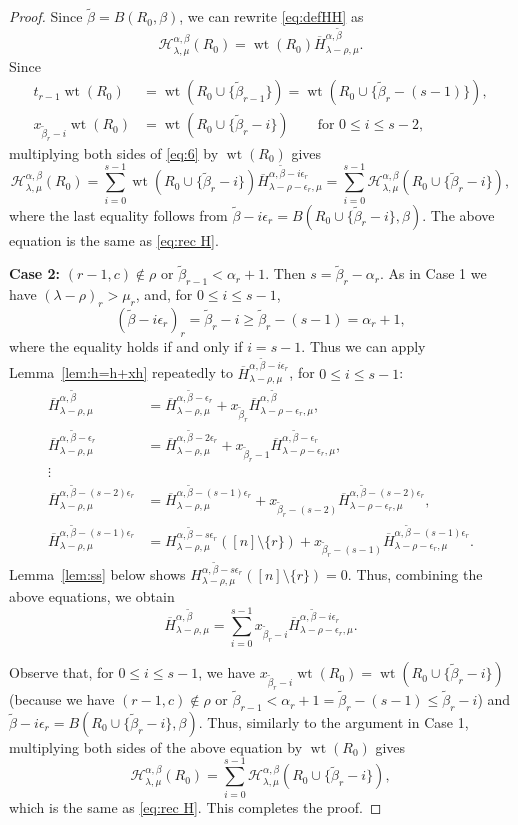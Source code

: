 \documentclass[12pt]{amsart}
\numberwithin{equation}{section}
\theoremstyle{definition}
\newcommand\wb{\widetilde{\beta}}
\newcommand\ovH{\overline{H}}
\newcommand\wt{\operatorname{wt}}
\newcommand\HH{\mathcal{H}}
\begin{document}
\begin{proof}
Since $\wb=B(R_0,\beta)$,
we can rewrite \eqref{eq:defHH} as
\[
  \HH_{\lambda,\mu}^{\alpha,\beta}(R_0)
  = \wt(R_0) \ovH_{\lambda-\rho,\mu}^{\alpha,\wb}.
\]
Since
\begin{align*}
t_{r-1}\wt(R_0) &= \wt(R_0\cup\{\wb_{r-1}\}) = \wt(R_0\cup\{\wb_{r}-(s-1)\}),\\
  x_{\wb_r-i} \wt(R_0)&=\wt(R_0\cup\{\wb_r-i\})
                        \qquad \mbox{for $0 \le i \le s-2$,}
\end{align*}
multiplying both sides of
\eqref{eq:6} by $\wt(R_0)$ gives
\[
  \HH^{\alpha,\beta}_{\lambda,\mu}(R_0)
    = \sum_{i=0}^{s-1} \wt(R_0\cup\{\wb_r-i\}) \ovH_{\lambda-\rho-\epsilon_r,\mu}^{\alpha,\wb-i\epsilon_r}
    = \sum_{i=0}^{s-1} \HH^{\alpha,\beta}_{\lambda,\mu}(R_0\cup\{\wb_r-i\}),
\]
where the last equality follows from $\wb-i\epsilon_r =
B(R_0\cup\{\wb_r-i\},\beta)$. The above equation is the same as \eqref{eq:rec
  H}.

\textbf{Case 2:} $(r-1,c)\not\in\rho$ or $\wb_{r-1}<\alpha_r+1$. Then
$s=\wb_r-\alpha_r$. As in Case 1 we have $(\lambda-\rho)_r>\mu_r$, and, for
$0\le i\le s-1$,
  \[
(\wb-i\epsilon_r)_r =\wb_r-i \ge \wb_r -(s-1) =  \alpha_r +1,
\]
where the equality holds if and only if $i=s-1$. Thus we can apply
Lemma~\ref{lem:h=h+xh} repeatedly to
$\ovH^{\alpha,\wb-i\epsilon_r}_{\lambda-\rho,\mu}$, for $0\le i\le s-1$:
\begin{align*}
  \ovH^{\alpha,\wb}_{\lambda-\rho,\mu} &=
  \ovH^{\alpha,\wb-\epsilon_r}_{\lambda-\rho,\mu}
  + x_{\wb_r}\ovH^{\alpha,\wb}_{\lambda-\rho-\epsilon_r,\mu},\\
  \ovH^{\alpha,\wb-\epsilon_r}_{\lambda-\rho,\mu} &=
  \ovH^{\alpha,\wb-2\epsilon_r}_{\lambda-\rho,\mu}
  + x_{\wb_r-1}\ovH^{\alpha,\wb-\epsilon_r}_{\lambda-\rho-\epsilon_r,\mu},\\
  \vdots \\
  \ovH^{\alpha,\wb-(s-2)\epsilon_r}_{\lambda-\rho,\mu} &=
  \ovH^{\alpha,\wb-(s-1)\epsilon_r}_{\lambda-\rho,\mu}
  + x_{\wb_r-(s-2)}\ovH^{\alpha,\wb-(s-2)\epsilon_r}_{\lambda-\rho-\epsilon_r,\mu},\\
  \ovH^{\alpha,\wb-(s-1)\epsilon_r}_{\lambda-\rho,\mu} &=
  H^{\alpha,\wb-s\epsilon_r}_{\lambda-\rho,\mu}([n]\setminus\{r\})
  + x_{\wb_r-(s-1)}\ovH^{\alpha,\wb-(s-1)\epsilon_r}_{\lambda-\rho-\epsilon_r,\mu}.
\end{align*}
Lemma~\ref{lem:ss} below shows
$H^{\alpha,\wb-s\epsilon_r}_{\lambda-\rho,\mu}([n]\setminus\{r\})= 0$. Thus,
combining the above equations, we obtain
\[
  \ovH^{\alpha,\wb}_{\lambda-\rho,\mu} =
  \sum_{i=0}^{s-1} x_{\wb_r-i}
  \ovH^{\alpha,\wb-i\epsilon_r}_{\lambda-\rho-\epsilon_r,\mu}.
\]

Observe that, for $0\le i\le s-1$, we have $x_{\wb_r-i}
\wt(R_0)=\wt(R_0\cup\{\wb_r-i\})$ (because we have $(r-1,c) \notin \rho$ or
$\wb_{r-1} < \alpha_r + 1 = \wb_r - (s-1) \le \wb_r - i$) and $\wb-i\epsilon_r =
B(R_0\cup\{\wb_r-i\},\beta)$. Thus, similarly to the argument in Case 1,
multiplying both sides of the above equation by $\wt(R_0)$ gives
\[
  \HH^{\alpha,\beta}_{\lambda,\mu}(R_0)
    = \sum_{i=0}^{s-1} \HH^{\alpha,\beta}_{\lambda,\mu}(R_0\cup\{\wb_r-i\}),
\]
which is the same as \eqref{eq:rec H}.
This completes the proof.
\end{proof}
\end{document}
